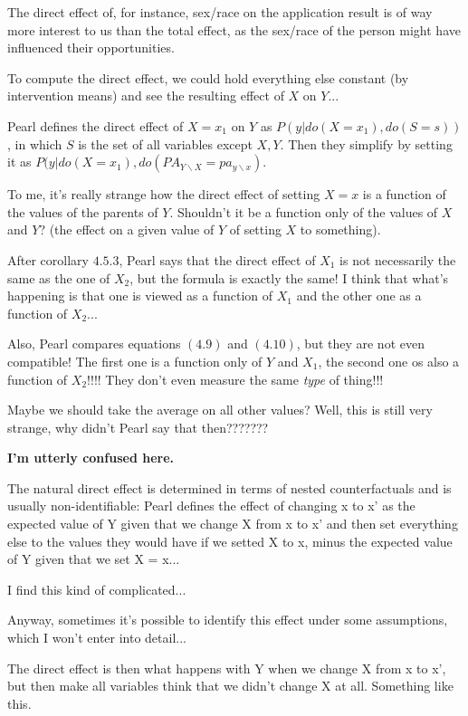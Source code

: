 The direct effect of, for instance, sex/race on the application result is of way more interest to us than the total effect, as the sex/race of the person might have influenced their opportunities.

To compute the direct effect, we could hold everything else constant (by intervention means) and see the resulting effect of $X$ on $Y$...

Pearl defines the direct effect of $X=x_1$ on $Y$ as $P(y|do(X=x_1),do(S=s))$, in which $S$ is the set of all variables except $X,Y$. Then they simplify by setting it as $P(y|do(X=x_1),do(PA_{Y\backslash X} = pa_{y\backslash x})$.

To me, it's really strange how the direct effect of setting $X=x$ is a function of the values of the parents of $Y$. Shouldn't it be a function only of the values of $X$ and $Y$? (the effect on a given value of $Y$ of setting $X$ to something).

After corollary $4.5.3$, Pearl says that the direct effect of $X_1$ is not necessarily the same as the one of $X_2$, but the formula is exactly the same! I think that what's happening is that one is viewed as a function of $X_1$ and the other one as a function of $X_2$...

Also, Pearl compares equations $(4.9)$ and $(4.10)$, but they are not even compatible! The first one is a function only of $Y$ and $X_1$, the second one os also a function of $X_2$!!!! They don't even measure the same \textit{type} of thing!!!

Maybe we should take the average on all other values? Well, this is still very strange, why didn't Pearl say that then???????

\textbf{I'm utterly confused here.}

The natural direct effect is determined in terms of nested counterfactuals and is usually non-identifiable: Pearl defines the effect of changing x to x' as the expected value of Y given that we change X from x to x' and then set everything else to the values they would have if we setted X to x, minus the expected value of Y given that we set X = x...

I find this kind of complicated... 

Anyway, sometimes it's possible to identify this effect under some assumptions, which I won't enter into detail...

The direct effect is then what happens with Y when we change X from x to x', but then make all variables think that we didn't change X at all. Something like this.

